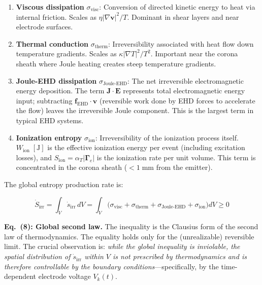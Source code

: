 \documentclass[12pt,twocolumn]{article}
\newcommand{\ee}{\mathbf{E}}
\newcommand{\jj}{\mathbf{J}}
\newcommand{\vv}{\mathbf{v}}
\newcommand{\ff}{\mathbf{f}}
\newcommand{\Sdot}{\dot{S}_{\mathrm{irr}}}
\newcommand{\sdot}{\dot{s}_{\mathrm{irr}}}
\begin{document}
\begin{enumerate}
  \item \textbf{Viscous dissipation} $\sigma_{\mathrm{visc}}$:
    Conversion of directed kinetic energy to heat via internal
    friction. Scales as $\eta |\nabla\vv|^2 / T$. Dominant in
    shear layers and near electrode surfaces.

  \item \textbf{Thermal conduction} $\sigma_{\mathrm{therm}}$:
    Irreversibility associated with heat flow down temperature
    gradients. Scales as $\kappa |\nabla T|^2 / T^2$. Important
    near the corona sheath where Joule heating creates steep
    temperature gradients.

  \item \textbf{Joule-EHD dissipation} $\sigma_{\mathrm{Joule\text{-}EHD}}$:
    The net irreversible electromagnetic energy deposition. The term
    $\jj \cdot \ee$ represents total electromagnetic energy input;
    subtracting $\ff_{\mathrm{EHD}} \cdot \vv$ (reversible work
    done by EHD forces to accelerate the flow) leaves the
    irreversible Joule component. This is the largest term in
    typical EHD systems.

  \item \textbf{Ionization entropy} $\sigma_{\mathrm{ion}}$:
    Irreversibility of the ionization process itself.
    $W_{\mathrm{ion}}\;[\mathrm{J}]$ is the effective ionization
    energy per event (including excitation losses), and
    $S_{\mathrm{ion}} = \alpha_T |\bm{\Gamma}_e|$ is the ionization
    rate per unit volume. This term is concentrated in the corona
    sheath ($<1\;\mathrm{mm}$ from the emitter).
\end{enumerate}

The global entropy production rate is:

\begin{equation}
\boxed{
  \Sdot = \int_V \sdot \, dV
  = \int_V \bigl(
    \sigma_{\mathrm{visc}}
    + \sigma_{\mathrm{therm}}
    + \sigma_{\mathrm{Joule\text{-}EHD}}
    + \sigma_{\mathrm{ion}}
  \bigr) dV \geq 0
}
\tag{8}
\label{eq:entropy_global}
\end{equation}

\noindent
\textbf{Eq.~(8): Global second law.} The inequality is the Clausius
form of the second law of thermodynamics. The equality holds only
for the (unrealizable) reversible limit. The crucial observation is:
\emph{while the global inequality is inviolable, the spatial
distribution of $\sdot$ within $V$ is not prescribed by thermodynamics
and is therefore controllable by the boundary conditions}---specifically,
by the time-dependent electrode voltage $V_k(t)$.
\end{document}
